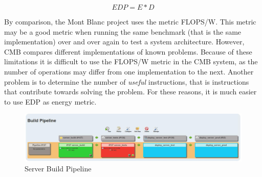 \begin{equation}
  \label{eq:edp}
  EDP = E * D
\end{equation}

By comparison, the Mont Blanc project uses the metric FLOPS/W. This metric may be a good metric when running the same benchmark (that is the same implementation) over and over again to test a system architecture. However, CMB compares different implementations of known problems. Because of these limitations it is difficult to use the FLOPS/W metric in the CMB system, as the number of operations may differ from one implementation to the next. Another problem is to determine the number of \textit{useful} instructions, that is instructions that contribute towards solving the problem. For these reasons, it is much easier to use EDP as energy metric.

\begin{figure}
  \includegraphics[width=1.0\textwidth]{figs/server_pipeline.jpg}
  \caption[Server Build Pipeline]{Server Build Pipeline}
  \label{fig:server-ci}
\end{figure}

